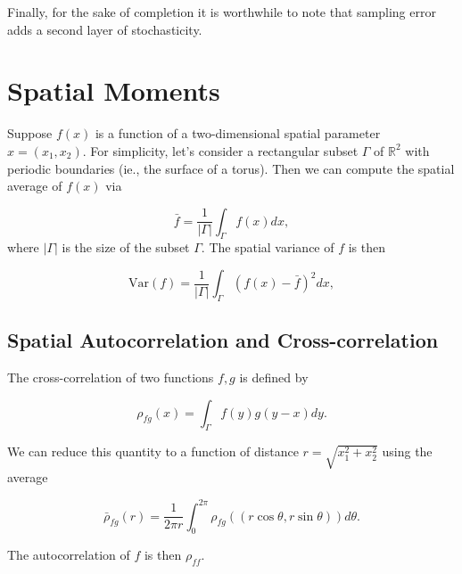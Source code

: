 \documentclass{article}
\begin{document}
Finally, for the sake of completion it is worthwhile to note that
sampling error adds a second layer of stochasticity.

\newpage

\appendix

\hypertarget{spatial-moments}{%
\section{Spatial Moments}\label{spatial-moments}}

Suppose \(f(x)\) is a function of a two-dimensional spatial parameter
\(x=(x_1,x_2)\). For simplicity, let's consider a rectangular subset
\(\Gamma\) of \(\mathbb R^2\) with periodic boundaries (ie., the surface
of a torus). Then we can compute the spatial average of \(f(x)\) via

\begin{equation}
  \bar f = \frac{1}{|\Gamma|}\int_\Gamma f(x)dx,
\end{equation} where \(|\Gamma|\) is the size of the subset \(\Gamma\).
The spatial variance of \(f\) is then

\begin{equation}
  \mathrm{Var}(f) = \frac{1}{|\Gamma|}\int_\Gamma (f(x)-\bar f)^2dx,
\end{equation}

\hypertarget{spatial-autocorrelation-and-cross-correlation}{%
\subsection{\texorpdfstring{Spatial Autocorrelation and
Cross-correlation
\label{corr-defs}}{Spatial Autocorrelation and Cross-correlation }}\label{spatial-autocorrelation-and-cross-correlation}}

The cross-correlation of two functions \(f,g\) is defined by

\begin{equation}
  \rho_{fg}(x)=\int_\Gamma f(y)g(y-x)dy.
\end{equation}

We can reduce this quantity to a function of distance
\(r=\sqrt{x_1^2+x_2^2}\) using the average

\begin{equation}
  \bar\rho_{fg}(r)=\frac{1}{2\pi r}\int_0^{2\pi}\rho_{fg}((r\cos\theta,r\sin\theta))d\theta.
\end{equation}

The autocorrelation of \(f\) is then \(\rho_{ff}\).
\end{document}
